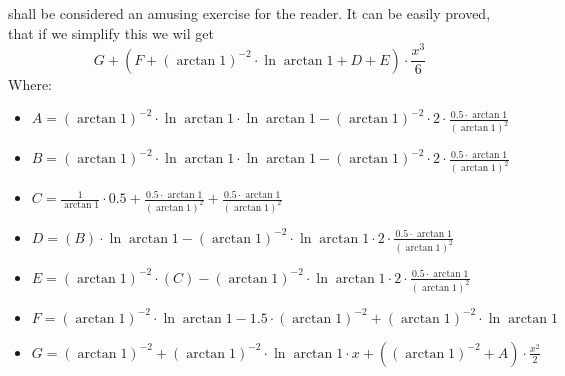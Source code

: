 \documentclass{article}
\begin{document}
shall be considered an amusing exercise for the reader.
It can be easily proved, that if we simplify this we wil get
\begin{equation}
G + \left( F + \left( \arctan 1 \right) ^{-2 } \cdot \ln \arctan 1 + D + E \right) \cdot \frac{x ^{3 } }{6 } 
\end{equation}
Where:
\begin{itemize}
	\item $A = \left( \arctan 1 \right) ^{-2 } \cdot \ln \arctan 1 \cdot \ln \arctan 1 - \left( \arctan 1 \right) ^{-2 } \cdot 2 \cdot \frac{0.5 \cdot \arctan 1 }{\left( \arctan 1 \right) ^{2 } } $
	\item $B = \left( \arctan 1 \right) ^{-2 } \cdot \ln \arctan 1 \cdot \ln \arctan 1 - \left( \arctan 1 \right) ^{-2 } \cdot 2 \cdot \frac{0.5 \cdot \arctan 1 }{\left( \arctan 1 \right) ^{2 } } $
	\item $C = \frac{1 }{\arctan 1 } \cdot 0.5 + \frac{0.5 \cdot \arctan 1 }{\left( \arctan 1 \right) ^{2 } } + \frac{0.5 \cdot \arctan 1 }{\left( \arctan 1 \right) ^{2 } } $
	\item $D = \left( B \right) \cdot \ln \arctan 1 - \left( \arctan 1 \right) ^{-2 } \cdot \ln \arctan 1 \cdot 2 \cdot \frac{0.5 \cdot \arctan 1 }{\left( \arctan 1 \right) ^{2 } } $
	\item $E = \left( \arctan 1 \right) ^{-2 } \cdot \left( C \right) - \left( \arctan 1 \right) ^{-2 } \cdot \ln \arctan 1 \cdot 2 \cdot \frac{0.5 \cdot \arctan 1 }{\left( \arctan 1 \right) ^{2 } } $
	\item $F = \left( \arctan 1 \right) ^{-2 } \cdot \ln \arctan 1 - 1.5 \cdot \left( \arctan 1 \right) ^{-2 } + \left( \arctan 1 \right) ^{-2 } \cdot \ln \arctan 1 $
	\item $G = \left( \arctan 1 \right) ^{-2 } + \left( \arctan 1 \right) ^{-2 } \cdot \ln \arctan 1 \cdot x + \left( \left( \arctan 1 \right) ^{-2 } + A \right) \cdot \frac{x ^{2 } }{2 } $
\end{itemize}
\end{document}
